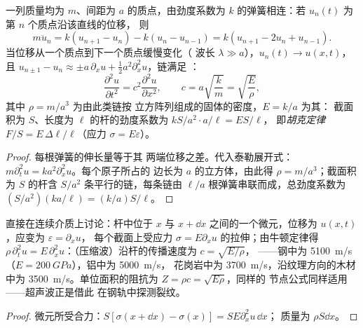 \begin{proposition}\label{prop:b2:waves-on-strings:chain}
一列质量均为 $m$、间距为 $a$ 的质点，由劲度系数为
$k$ 的弹簧相连：若 $u_n(t)$ 为第 $n$ 个质点沿该直线的位移，
则
\[
m\ddot u_n = k(u_{n+1} - u_n) - k(u_n - u_{n-1}) = k(u_{n+1} - 2u_n + u_{n-1}) .
\]
当位移从一个质点到下一个质点缓慢变化（
波长 $\lambda \gg a$），$u_n(t) \to u(x, t)$，且 $u_{n\pm1} - u_n \approx
\pm a\,\partial_xu + \tfrac12a^2\partial_x^2u$，链满足
：
\[
\frac{\partial^2u}{\partial t^2} = c^2\frac{\partial^2u}{\partial x^2} , \qquad
c = a\sqrt{\frac km} = \sqrt{\frac{E}{\rho}} ,
\]
其中 $\rho = m/a^3$ 为由此类链按
立方阵列组成的固体的密度，$E = k/a$ 为其\emph{}：
截面积为 $S$、长度为 $\ell$ 的杆的劲度系数为 $kS/a^2\cdot a/\ell = ES/\ell$，
即\emph{胡克定律} $F/S = E\,\Delta\ell/\ell$（应力 $\sigma = E\varepsilon$）。
\end{proposition}

\begin{proof}
每根弹簧的伸长量等于其
两端位移之差。代入泰勒展开式：$m\partial_t^2u = ka^2\partial_x^2u$。每个原子所占的
边长为 $a$ 的立方体，由此得 $\rho = m/a^3$；截面积为 $S$ 的杆含
$S/a^2$ 条平行的链，每条链由 $\ell/a$ 根弹簧串联而成，总劲度系数为
$(S/a^2)(ka/\ell) = (k/a)S/\ell$。
\end{proof}

\begin{proposition}[杆中的纵波]\label{prop:b2:waves-on-strings:rod}
直接在连续介质上讨论：杆中位于 $x$ 与 $x +
\dd x$ 之间的一个微元，位移为 $u(x, t)$，应变为 $\varepsilon = \partial_xu$，
每个截面上受应力 $\sigma = E\partial_xu$ 的拉伸；由牛顿定律得 $\rho\,\partial_t^2u =
E\,\partial_x^2u$：（压缩波）沿杆的传播速度为 $c = \sqrt{E/\rho}$，
——钢中为 \qty{5100}{m/s}（$E = \qty{200}{GPa}$），铝中为 \qty{5000}{m/s}，
花岗岩中为 \qty{3700}{m/s}，沿纹理方向的木材中为
\qty{3500}{m/s}。单位面积的阻抗为 $Z = \rho c = \sqrt{E\rho}$，同样的
节点公式同样适用——超声波正是借此
在钢轨中探测裂纹。
\end{proposition}

\begin{proof}
微元所受合力：$S[\sigma(x + \dd x) - \sigma(x)] = SE\partial_x^2u\,\dd x$；
质量为 $\rho S\dd x$。
\end{proof}

